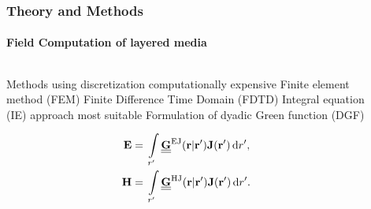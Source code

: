\documentclass[mathserif,16pt,xcolor=table]{beamer}
\begin{document}
      \begin{frame}
        \frametitle{Theory and Methods}
        \framesubtitle{Field Computation of layered media}
        \begin{columns}[T] %
          \begin{column}{.65\textwidth}
            \begin{outline}[itemize]
                \1 Methods using discretization computationally expensive
                    \2 Finite element method (FEM)
                    \2 Finite Difference Time Domain (FDTD)
                \1 Integral equation (IE) approach most suitable
                    \2 Formulation of dyadic Green function (DGF)
              \end{outline}
            \begin{subequations} \nonumber
              \begin{align}
                \v E ={}& \int\limits_{r'} \tnsr{\v{G}}^\mathrm{EJ}(\v r | \v{r'}) \v{J}(\v{r'}) \diff{r'},
                \label{eq:dyadic_E}\\
                \v H ={}& \int\limits_{r'} \tnsr{\v{G}}^\mathrm{HJ}(\v r | \v{r'}) \v{J}(\v{r'}) \diff{r'}.
                \label{eq:dyadic_H}
              \end{align}
              \label{eq:dyadic}%
            \end{subequations}
          \end{column}
          \begin{column}[T]{.5\textwidth}
            \begin{figure}
              \centering \vspace*{-1.5cm} \hspace*{-1cm}
              \fontsize{5}{6}\selectfont
              \def\svgwidth{.4\linewidth}
              
            \end{figure}
          \end{column}
        \end{columns}
      \end{frame}
\end{document}

